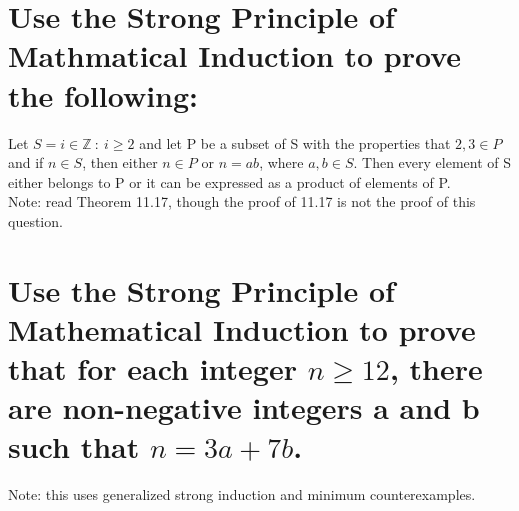 \section{Use the Strong Principle of Mathmatical Induction to prove the following:}
Let $S={i\in \mathbb{Z}\ : \ i\geq 2}$ and let P be a subset of S with the properties that 
$2 , 3 \in P$ and if 
$n\in S$, then either 
$n\in P$ or 
$n=ab$, where 
$a,b\in S$.
Then every element of S either belongs to P or it can be expressed as a product of elements of P.\\
Note: read Theorem 11.17, though the proof of 11.17 is not the proof of this question.


\section{Use the Strong Principle of Mathematical Induction to prove that for each integer $n\geq 12$, there are non-negative integers a and b such that $n = 3a + 7b$.} 
Note: this uses generalized strong induction and minimum counterexamples.



 
